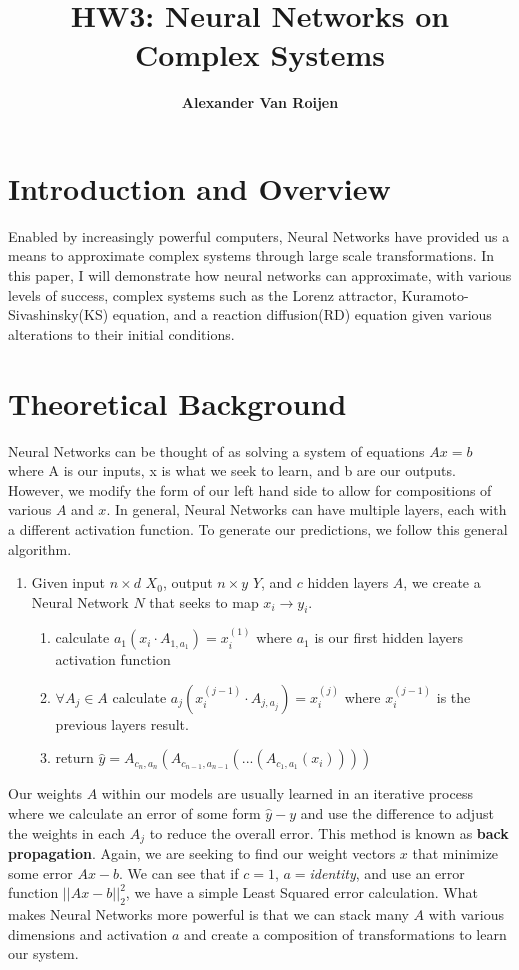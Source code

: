 \documentclass[12pt]{article}
\begin{document}
	
	\title{%
		HW3: Neural Networks on Complex Systems}
	\author{\bf Alexander Van Roijen}
	
	\maketitle
	\section{Introduction and Overview}
	 Enabled by increasingly powerful computers, Neural Networks have provided us a means to approximate complex systems through large scale transformations. In this paper, I will demonstrate how neural networks can approximate, with various levels of success, complex systems such as the Lorenz attractor, Kuramoto-Sivashinsky(KS) equation, and a reaction diffusion(RD) equation given various alterations to their initial conditions.
	
	\section{Theoretical Background}
	Neural Networks can be thought of as solving a system of equations $Ax=b$ where A is our inputs, x is what we seek to learn, and b are our outputs. However, we modify the form of our left hand side to allow for compositions of various $A$ and $x$. In general, Neural Networks can have multiple layers, each with a different activation function. To generate our predictions, we follow this general algorithm.
	\par
	\begin{enumerate}
		\item Given input $n\times d\,\,X_0$, output $n \times y$ $Y$, and $c$ hidden layers $A$, we create a Neural Network $N$ that seeks to map $x_i \rightarrow y_i$.\\
		\begin{enumerate}
			\item calculate $a_1(x_i \cdot A_{1,a_1}) = x_i^{(1)}$ where $a_1$ is our first hidden layers activation function
			\item $\forall A_j \in A$ calculate $a_j(x_i^{(j-1)} \cdot A_{j,a_j}) = x_i^{(j)}$ where $x_i^{(j-1)}$ is the previous layers result.
			\item return $\hat{y} = A_{c_n,a_n}(A_{c_{n-1},a_{n-1}}(...(A_{c_1,a_1}(x_i))))$ 
		\end{enumerate}
	\end{enumerate}
	\par 
	Our weights $A$ within our models are usually learned in an iterative process where we calculate an error of some form $\hat{y} - y$ and use the difference to adjust the weights in each $A_j$ to reduce the overall error. This method is known as \textbf{back propagation}. Again, we are seeking to find our weight vectors $x$ that minimize some error $Ax-b$. We can see that if $c=1$, $a=$\textit{identity}, and use an error function $\lvert \lvert Ax-b\rvert \rvert _2^2$, we have a simple Least Squared error calculation. What makes Neural Networks more powerful is that we can stack many $A$ with various dimensions and activation $a$ and create a composition of transformations to learn our system.
	
\end{document}
